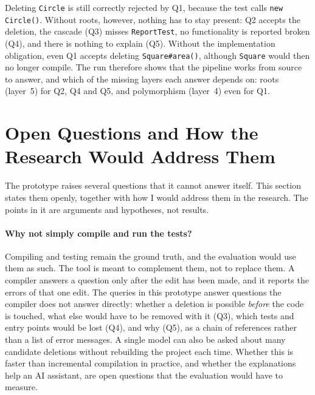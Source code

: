 \documentclass[11pt,a4paper]{article}
\newcommand{\code}[1]{\texttt{#1}}
\begin{document}
Deleting \code{Circle} is still correctly rejected by Q1, because the test
calls \code{new Circle()}. Without roots, however, nothing has to stay
present: Q2 accepts the deletion, the cascade (Q3) misses
\code{ReportTest}, no functionality is reported broken (Q4), and there is
nothing to explain (Q5). Without the implementation obligation, even Q1
accepts deleting \code{Square\#area()}, although \code{Square} would then no
longer compile. The run therefore shows that the pipeline works from
source to answer, and which of the missing layers each answer depends on:
roots (layer~5) for Q2, Q4 and Q5, and polymorphism (layer~4) even for
Q1.

\section{Open Questions and How the Research Would Address Them}\label{sec:questions}

The prototype raises several questions that it cannot answer itself. This
section states them openly, together with how I would address them in
the research. The points in it are arguments and hypotheses, not results.

\paragraph{Why not simply compile and run the tests?}
Compiling and testing remain the ground truth, and the evaluation would
use them as such. The tool is meant to complement them, not to replace
them. A compiler answers a question only after the edit has been made,
and it reports the errors of that one edit. The queries in this
prototype answer questions the compiler does not answer directly: whether
a deletion is possible \emph{before} the code is touched, what else would
have to be removed with it (Q3), which tests and entry points would be
lost (Q4), and why (Q5), as a chain of references rather than a list of
error messages. A single model can also be asked about many candidate
deletions without rebuilding the project each time. Whether this is
faster than incremental compilation in practice, and whether the
explanations help an AI assistant, are open questions that the
evaluation would have to measure.
\end{document}
